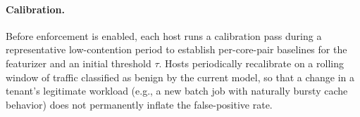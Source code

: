 \paragraph{Calibration.} Before enforcement is enabled, each host runs a calibration pass
during a representative low-contention period to establish per-core-pair baselines for the
featurizer and an initial threshold $\tau$. Hosts periodically recalibrate on a rolling
window of traffic classified as benign by the current model, so that a change in a tenant's
legitimate workload (e.g., a new batch job with naturally bursty cache behavior) does not
permanently inflate the false-positive rate.
